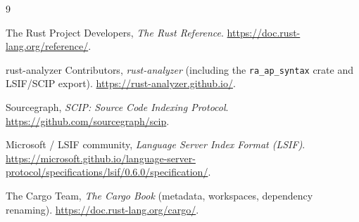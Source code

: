 \documentclass[11pt,a4paper,oneside]{report}
\begin{document}
\begin{thebibliography}{9}

  The Rust Project Developers,
  \emph{The Rust Reference}.
  \url{https://doc.rust-lang.org/reference/}.

  rust-analyzer Contributors,
  \emph{rust-analyzer} (including the \texttt{ra\_ap\_syntax} crate and LSIF/SCIP export).
  \url{https://rust-analyzer.github.io/}.

  Sourcegraph,
  \emph{SCIP: Source Code Indexing Protocol}.
  \url{https://github.com/sourcegraph/scip}.

  Microsoft / LSIF community,
  \emph{Language Server Index Format (LSIF)}.
  \url{https://microsoft.github.io/language-server-protocol/specifications/lsif/0.6.0/specification/}.

  The Cargo Team,
  \emph{The Cargo Book} (metadata, workspaces, dependency renaming).
  \url{https://doc.rust-lang.org/cargo/}.

\end{thebibliography}
\end{document}
